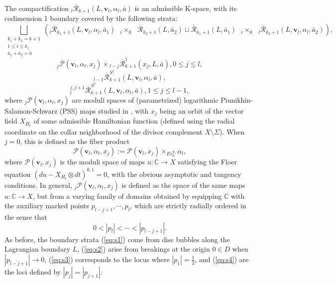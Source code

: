 \documentclass[a4paper]{article}
\numberwithin{equation}{section}
\begin{document}
The compactification ${}_l\overline{\mathcal{R}}_{k+1}(L,\mathbf{v}_l,\alpha_l,\bar{a})$ is an admissible K-space, with its codimension 1 boundary covered by the following strata:
\begin{equation}\label{eq:s1}
\bigsqcup_{\substack{k_1+k_2=k+1\\1\leq i\leq k_1\\ \bar{a}_1+\bar{a}_2=\bar{a}}}\left({}_l\overline{\mathcal{R}}_{k_1+1}(L,\mathbf{v}_l,\alpha_l,\bar{a}_1)\textrm{ }{{}_i\times_0}\textrm{ }\overline{\mathcal{R}}_{k_2+1}(L,\bar{a}_2)\sqcup\overline{\mathcal{R}}_{k_1+1}(L,\bar{a}_1)\textrm{ }{{}_i\times_0}\textrm{ }{}_l\overline{\mathcal{R}}_{k_2+1}(L,\mathbf{v}_l,\alpha_l,\bar{a}_2)\right),
\end{equation}
\begin{equation}\label{eq:s2}
{}_j\overline{\mathcal{P}}(\mathbf{v}_l,\alpha_l,x_j)\times{}_{l-j}\overline{\mathcal{R}}^1_{k+1}(x_j,L,\bar{a}), 0\leq j\leq l,
\end{equation}
\begin{equation}\label{eq:s3}
{}_{l-1}\overline{\mathcal{R}}^{S^1}_{k+1}(L,\mathbf{v}_l,\alpha_l,\bar{a}),
\end{equation}
\begin{equation}\label{eq:s4}
{}_l^{j,j+1}\overline{\mathcal{R}}^{S^1}_{k+1}(L,\mathbf{v}_l,\alpha_l,\bar{a}), 1\leq j\leq l-1,
\end{equation}
where ${}_j\mathcal{P}(\mathbf{v}_l,\alpha_l,x_j)$ are moduli spaces of (parametrized) logarithmic Piunikhin-Salamon-Schwarz (PSS) maps studied in \cite{gp1}, with $x_j$ being an orbit of the vector field $X_{H_t}$ of some admissible Hamiltonian function (defined using the radial coordinate on the collar neighborhood of the divisor complement $X\setminus\Sigma$). When $j=0$, this is defined as the fiber product
\begin{equation}
\mathcal{P}(\mathbf{v}_l,\alpha_l,x_j):=\mathcal{P}(\mathbf{v}_l,x_j)\times_{\mathit{Ev}_0^{\mathbf{v}_l}}\alpha_l,
\end{equation}
where $\mathcal{P}(\mathbf{v}_l,x_j)$ is the moduli space of maps $u:\mathbb{C}\rightarrow X$ satisfying the Floer equation $(du-X_{H_t}\otimes dt)^{0,1}=0$, with the obvious asymptotic and tangency conditions. In general, ${}_j\mathcal{P}(\mathbf{v}_l,\alpha_l,x_j)$ is defined as the space of the same maps $u:\mathbb{C}\rightarrow X$, but from a varying family of domains obtained by equipping $\mathbb{C}$ with the auxiliary marked points $p_{l-j+1},\cdots,p_l$, which are strictly radially ordered in the sense that
\begin{equation}
0<|p_l|<\cdots<|p_{l-j+1}|.
\end{equation}
As before, the boundary strata (\ref{eq:s1}) come from disc bubbles along the Lagrangian boundary $L$, (\ref{eq:s2}) arise from breakings at the origin $0\in D$ when $|p_{l-j+1}|\rightarrow0$, (\ref{eq:s3}) corresponds to the locus where $|p_1|=\frac{1}{2}$, and (\ref{eq:s4}) are the loci defined by $|p_j|=|p_{j+1}|$.
\end{document}

